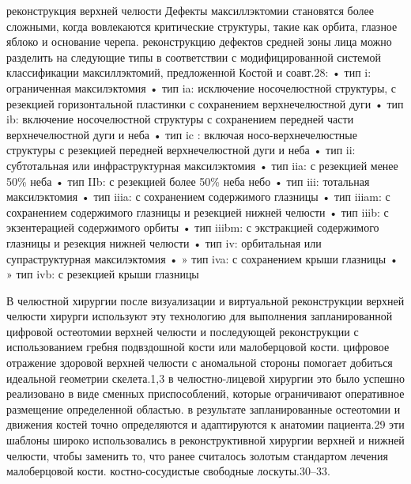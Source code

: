реконструкция верхней челюсти
Дефекты максиллэктомии становятся более сложными, когда вовлекаются критические
структуры, такие как орбита, глазное яблоко и основание черепа. реконструкцию
дефектов средней зоны лица можно разделить на следующие типы в соответствии с
модифицированной системой классификации максиллэктомий, предложенной Костой и
соавт.28:
• тип i: ограниченная максилэктомия • тип ia: исключение носочелюстной
структуры, с резекцией горизонтальной пластинки с сохранением верхнечелюстной
дуги 
• тип ib: включение носочелюстной структуры с сохранением передней части
верхнечелюстной дуги и неба 
• тип ic : включая носо-верхнечелюстные структуры с
резекцией передней верхнечелюстной дуги и неба 
• тип ii: субтотальная или
инфраструктурная максилэктомия 
• тип iia: с резекцией менее 50\% неба 
• тип IIb: с резекцией более 50\% неба небо 
• тип iii: тотальная максилэктомия • тип iiia: с сохранением содержимого глазницы 
• тип iiiam: с сохранением содержимого глазницы
						и резекцией нижней челюсти 
• тип iiib: с экзентерацией содержимого орбиты 
• тип iiibm: с экстракцией содержимого глазницы и резекция нижней челюсти 
• тип iv: орбитальная или супраструктурная максилэктомия 
• » тип iva: с сохранением крыши глазницы 
• » тип ivb: с резекцией крыши глазницы

В челюстной хирургии после визуализации и виртуальной реконструкции верхней
челюсти хирурги используют эту технологию для выполнения запланированной
цифровой остеотомии верхней челюсти и последующей реконструкции с использованием
гребня подвздошной кости или малоберцовой кости. цифровое отражение здоровой
верхней челюсти с аномальной стороны помогает добиться идеальной геометрии
скелета.1,3 в челюстно-лицевой хирургии это было успешно реализовано в виде
сменных приспособлений, которые ограничивают оперативное размещение определенной
областью. в результате запланированные остеотомии и движения костей точно
определяются и адаптируются к анатомии пациента.29 эти шаблоны широко
использовались в реконструктивной хирургии верхней и нижней челюсти, чтобы
заменить то, что ранее считалось золотым стандартом лечения малоберцовой кости.
костно-сосудистые свободные лоскуты.30–33.

